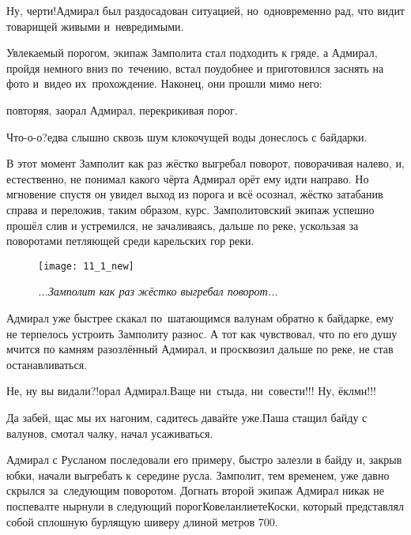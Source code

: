 \diagdash Ну, черти!\mdash Адмирал был раздосадован ситуацией, но~одновременно рад, что видит товарищей живыми и~невредимыми.

Увлекаемый порогом, экипаж Замполита стал подходить к гряде, а Адмирал, пройдя немного вниз по~течению, встал поудобнее и приготовился заснять на фото и~видео их~прохождение. Наконец, они прошли мимо него:

\mdash повторяя, заорал Адмирал, перекрикивая порог.

\diagdash Что-о-о?\mdash едва слышно сквозь шум клокочущей воды донеслось с байдарки.


В этот момент Замполит как раз жёстко выгребал поворот, поворачивая налево, и, естественно, не понимал какого чёрта Адмирал орёт ему идти направо. Но мгновение спустя он увидел выход из порога и всё осознал, жёстко затабанив справа и переложив, таким образом, курс. Замполитовский экипаж успешно прошёл слив и устремился, не зачаливаясь, дальше по реке, ускользая за поворотами петляющей среди карельских гор реки.  %
\begin{figure}[h]
	\centering
	\texttt{[image: 11\_1\_new]}
	\caption{\small\textit{...Замполит как раз жёстко выгребал поворот...}}
\end{figure}

Адмирал уже быстрее скакал по~шатающимся валунам обратно к байдарке, ему не терпелось устроить Замполиту разнос. А тот как чувствовал, что по его душу мчится по камням разозлённый Адмирал, и просквозил дальше по реке, не став останавливаться.

\diagdash Не, ну вы видали?!\mdash орал Адмирал.\mdash Ваще ни~стыда, ни~совести!!! Ну, ёклмн!!!

\diagdash Да забей, щас мы их нагоним, садитесь давайте уже.\mdash Паша стащил байду с валунов, смотал чалку, начал усаживаться. 

Адмирал с Русланом последовали его примеру, быстро залезли в байду и, закрыв юбки, начали выгребать к~середине русла. Замполит, тем временем, уже давно скрылся за~следующим поворотом. Догнать второй экипаж Адмирал никак не поспевал\mdash те нырнули в следующий порог\mdash Ковеланлиете\sdash Коски, который представлял собой сплошную бурлящую шиверу длиной метров 700.

